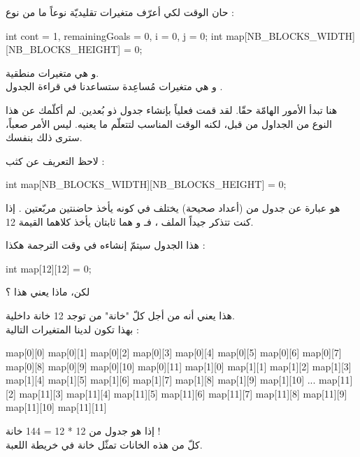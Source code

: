 حان الوقت لكي أعرّف متغيرات تقليديّة نوعاً ما من نوع 
 :

\begin{Csource}
int cont = 1, remainingGoals = 0, i = 0, j = 0;
int map[NB_BLOCKS_WIDTH][NB_BLOCKS_HEIGHT] = {0};
\end{Csource}

و 
هي متغيرات منطقية.\\
و
هي متغيرات مُساعِدة ستساعدنا في قراءة الجدول 
.

هنا تبدأ الأمور الهامّة حقّا. لقد قمت فعلياً بإنشاء جدول ذو بُعدين. لم أكلّمك عن هذا النوع من الجداول من قبل، لكنه الوقت المناسب لتتعلّم ما يعنيه. ليس الأمر صعباً، سترى ذلك بنفسك.

لاحظ التعريف عن كثب :

\begin{Csource}
int map[NB_BLOCKS_WIDTH][NB_BLOCKS_HEIGHT] = {0};
\end{Csource}

هو عبارة عن جدول من 
(أعداد صحيحة) يختلف في كونه يأخذ حاضنتين مربّعتين
\InlineCode{[ ]}.
إذا كنت تتذكر جيداً الملف 
،
 فـ
و
هما ثابتان يأخذ كلاهما القيمة 12.

هذا الجدول سيتمّ إنشاءه في وقت الترجمة هكذا :

\begin{Csource}
int map[12][12] = {0};
\end{Csource}

\begin{question}
لكن، ماذا يعني هذا ؟
\end{question}

هذا يعني أنه من أجل كلّ "خانة" من
توجد 12 خانة داخلية.\\
بهذا تكون لدينا المتغيرات التالية :

\begin{Console}
map[0][0]
map[0][1]
map[0][2]
map[0][3]
map[0][4]
map[0][5]
map[0][6]
map[0][7]
map[0][8]
map[0][9]
map[0][10]
map[0][11]
map[1][0]
map[1][1]
map[1][2]
map[1][3]
map[1][4]
map[1][5]
map[1][6]
map[1][7]
map[1][8]
map[1][9]
map[1][10]
...
map[11][2]
map[11][3]
map[11][4]
map[11][5]
map[11][6]
map[11][7]
map[11][8]
map[11][9]
map[11][10]
map[11][11]
\end{Console}

إذا هو جدول من 12 * 12 = 144 خانة !\\
كلّ من هذه الخانات تمثّل خانة في خريطة اللعبة.

